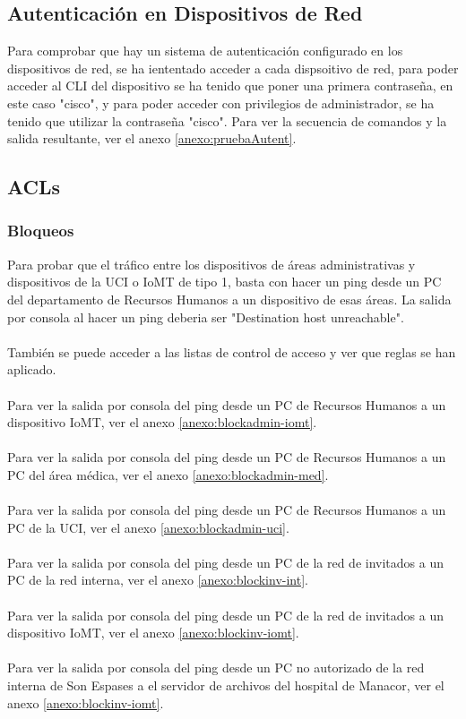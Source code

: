 \subsection{Autenticación en Dispositivos de Red}
Para comprobar que hay un sistema de autenticación configurado en los dispositivos de red, se ha iententado acceder a cada dispsoitivo de red, para poder acceder al CLI del dispositivo se ha tenido que poner una primera contraseña, 
en este caso "cisco", y para poder acceder con privilegios de administrador, se ha tenido que utilizar la contraseña "cisco". Para ver la secuencia de comandos y la salida resultante, ver el anexo \ref{anexo:pruebaAutent}.

\subsection{ACLs}
\subsubsection{Bloqueos}
Para probar que el tráfico entre los dispositivos de áreas administrativas y dispositivos de la UCI o IoMT de tipo 1, basta con hacer un ping desde un PC del departamento de Recursos Humanos 
a un dispositivo de esas áreas. La salida por consola al hacer un ping deberia ser "Destination host unreachable". 
\\ \\
También se puede acceder a las listas de control de acceso y ver que reglas se han aplicado. 
\\ \\
Para ver la salida por consola del ping desde un PC de Recursos Humanos a un dispositivo IoMT, ver el anexo \ref{anexo:blockadmin-iomt}.
\\ \\
Para ver la salida por consola del ping desde un PC de Recursos Humanos a un PC del área médica, ver el anexo \ref{anexo:blockadmin-med}.
\\ \\
Para ver la salida por consola del ping desde un PC de Recursos Humanos a un PC de la UCI, ver el anexo \ref{anexo:blockadmin-uci}.
\\ \\
Para ver la salida por consola del ping desde un PC de la red de invitados a un PC de la red interna, ver el anexo \ref{anexo:blockinv-int}.
\\ \\
Para ver la salida por consola del ping desde un PC de la red de invitados a un dispositivo IoMT, ver el anexo \ref{anexo:blockinv-iomt}.
\\ \\
Para ver la salida por consola del ping desde un PC no autorizado de la red interna de Son Espases a el servidor de archivos del hospital de Manacor, ver el anexo \ref{anexo:blockinv-iomt}.

